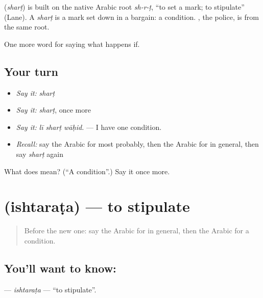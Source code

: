 \begin{cousinweb}
\textbf{} (\emph{sharṭ}) is built on the native Arabic root \emph{sh-r-ṭ}, \textquotedblleft{}to set a mark; to stipulate\textquotedblright{} (Lane). A \emph{sharṭ} is a mark set down in a bargain: a condition. , the police, is from the same root.
\end{cousinweb}

\begin{grammarlens}[title={What you've built}]
One more word for saying what happens if.
\end{grammarlens}

\subsection*{Your turn}
\begin{itemize}
\raggedright
  \item \emph{Say it:} \emph{sharṭ}
  \item \emph{Say it:} \emph{sharṭ}, once more
  \item \emph{Say it:} \emph{lī sharṭ wāḥid.} — I have one condition.
  \item \emph{Recall:} say the Arabic for most probably, then the Arabic for in general, then say \emph{sharṭ} again
\end{itemize}

\begin{tcolorbox}[breakable,colback=teal!4,colframe=teal!35!black,title={Before you move on}]
What does  mean? (\textquotedblleft{}A condition\textquotedblright{}.) Say it once more.
\end{tcolorbox}
\section[\texorpdfstring{\ar{اشترط} (ishtaraṭa)}{اشترط (ishtaraṭa)}]{ (ishtaraṭa) — to stipulate}

\label{lesson:AR-C404-ishtarata}



\begin{quote}
Before the new one: say the Arabic for in general, then the Arabic for a condition.
\end{quote}

\subsection*{You'll want to know: }
\textbf{} — \emph{ishtaraṭa} — \textquotedblleft{}to stipulate\textquotedblright{}.

